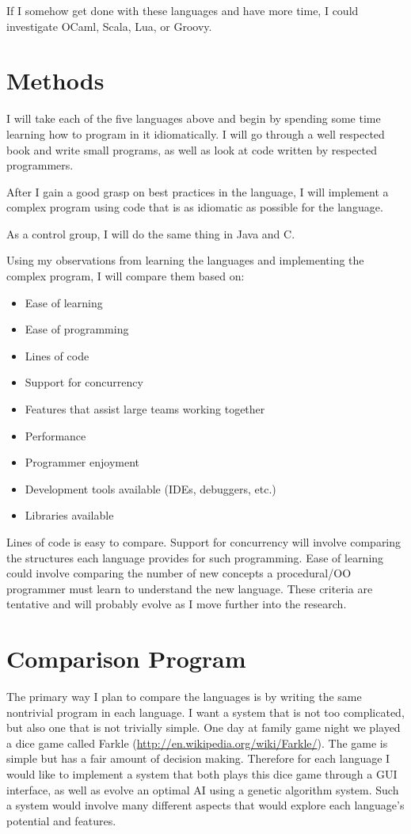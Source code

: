 \documentclass{article}
\begin{document}
If I somehow get done with these languages and have more time, I could
investigate OCaml, Scala, Lua, or Groovy.

\section{Methods}

I will take each of the five languages above and begin by spending some time
learning how to program in it idiomatically.  I will go through a well respected
book and write small programs, as well as look at code written by respected
programmers.

After I gain a good grasp on best practices in the language, I will implement a
complex program using code that is as idiomatic as possible for the language.

As a control group, I will do the same thing in Java and C.

Using my observations from learning the languages and implementing the complex
program, I will compare them based on:

\begin{itemize}
\item Ease of learning
\item Ease of programming
\item Lines of code
\item Support for concurrency
\item Features that assist large teams working together
\item Performance
\item Programmer enjoyment
\item Development tools available (IDEs, debuggers, etc.)
\item Libraries available
\end{itemize}

Lines of code is easy to compare.  Support for concurrency will involve
comparing the structures each language provides for such programming.  Ease of
learning could involve comparing the number of new concepts a procedural/OO
programmer must learn to understand the new language.  These criteria are
tentative and will probably evolve as I move further into the research.

\section{Comparison Program}

The primary way I plan to compare the languages is by writing the same nontrivial
program in each language.  I want a system that is not too complicated, but also
one that is not trivially simple.  One day at family game night we played a dice
game called Farkle (\url{http://en.wikipedia.org/wiki/Farkle/}).  The game is
simple but has a fair amount of decision making.  Therefore for each language I
would like to implement a system that both plays this dice game through a GUI
interface, as well as evolve an optimal AI using a genetic algorithm system.
Such a system would involve many different aspects that would explore each
language's potential and features.
\end{document}
